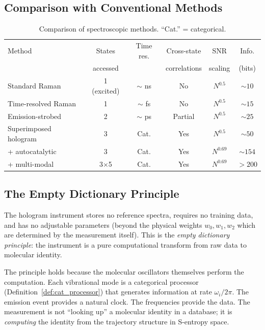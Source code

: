 \documentclass[11pt,twocolumn,a4paper]{article}
\theoremstyle{definition}
\theoremstyle{remark}
\begin{document}
\subsection{Comparison with Conventional Methods}

\begin{table}[ht]
\centering
\caption{Comparison of spectroscopic methods. ``Cat.'' = categorical.}
\label{tab:comparison}
\begin{tabular}{lccccc}
\toprule
Method & States & Time res. & Cross-state & SNR & Info. \\
 & accessed & & correlations & scaling & (bits) \\
\midrule
Standard Raman & 1 (excited) & $\sim$ ns & No & $N^{0.5}$ & $\sim 10$ \\
Time-resolved Raman & 1 & $\sim$ fs & No & $N^{0.5}$ & $\sim 15$ \\
Emission-strobed & 2 & $\sim$ ps & Partial & $N^{0.5}$ & $\sim 25$ \\
Superimposed hologram & 3 & Cat. & Yes & $N^{0.5}$ & $\sim 50$ \\
+ autocatalytic & 3 & Cat. & Yes & $N^{0.69}$ & $\sim 154$ \\
+ multi-modal & 3$\times$5 & Cat. & Yes & $N^{0.69}$ & $> 200$ \\
\bottomrule
\end{tabular}
\end{table}

\subsection{The Empty Dictionary Principle}

The hologram instrument stores no reference spectra, requires no training data, and has no adjustable parameters (beyond the physical weights $w_0, w_1, w_2$ which are determined by the measurement itself). This is the \emph{empty dictionary principle}: the instrument is a pure computational transform from raw data to molecular identity.

The principle holds because the molecular oscillators themselves perform the computation. Each vibrational mode is a categorical processor (Definition~\ref{def:cat_processor}) that generates information at rate $\omega_i / 2\pi$. The emission event provides a natural clock. The frequencies provide the data. The measurement is not ``looking up'' a molecular identity in a database; it is \emph{computing} the identity from the trajectory structure in S-entropy space.
\end{document}
